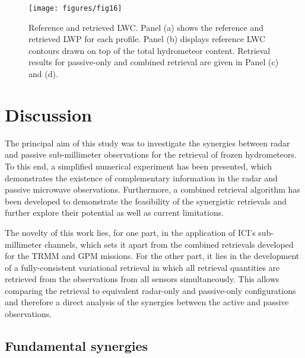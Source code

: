 \documentclass[journal abbreviation, manuscript]{copernicus}
\begin{document}
\begin{figure}
\centering
\texttt{[image: figures/fig16]}
\caption{Reference and retrieved LWC. Panel (a) shows the reference and retrieved
  LWP for each profile. Panel (b) displays reference LWC contours drawn on top
  of the total hydrometeor content. Retrieval results for passive-only and combined
  retrieval are given in Panel (c) and (d).}
\label{fig:results_cw_b}
\end{figure}


\section{Discussion}
\label{sec:discussion}

The principal aim of this study was to investigate the synergies between radar
and passive sub-millimeter observations for the retrieval of frozen
hydrometeors. To this end, a simplified numerical experiment has been presented,
which demonstrates the existence of complementary information in the radar and
passive microwave observations. Furthermore, a combined retrieval algorithm has
been developed to demonstrate the feasibility of the synergistic retrievals and
further explore their potential as well as current limitations.

The novelty of this work lies, for one part, in the application of ICI's
sub-millimeter channels, which sets it apart from the combined retrievals
developed for the TRMM and GPM missions. For the other part, it lies in the
development of a fully-consistent variational retrieval in which all retrieval
quantities are retrieved from the observations from all sensors simultaneously.
This allows comparing the retrieval to equivalent radar-only and passive-only
configurations and therefore a direct analysis of the synergies between the
active and passive observations.

\subsection{Fundamental synergies}
\end{document}
